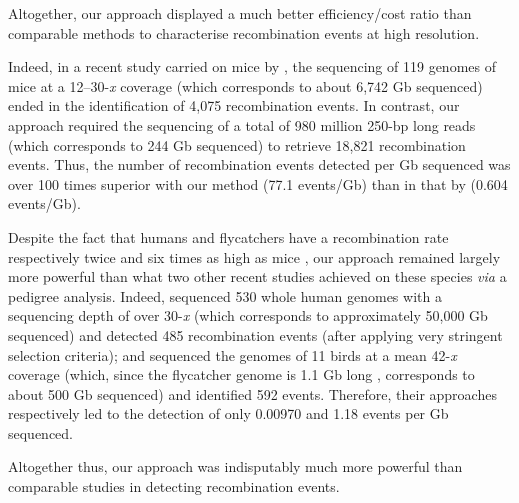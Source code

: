 \begin{mccorrection}
Altogether, our approach displayed a much better efficiency/cost ratio than comparable methods to characterise recombination events at high resolution.

Indeed, in a recent study carried on mice by \citet{li2018highresolution}, the sequencing of 119 genomes of mice at a 12--30-\textit{x} coverage (which corresponds to about 6,742 Gb sequenced) ended in the identification of 4,075 recombination events.
In contrast, our approach required the sequencing of a total of 980 million 250-bp long reads (which corresponds to 244 Gb sequenced) to retrieve 18,821 recombination events.
Thus, the number of recombination events detected per Gb sequenced was over 100 times superior with our method (77.1 events/Gb) than in that by \citet{li2018highresolution} (0.604 events/Gb).

Despite the fact that humans and flycatchers have a recombination rate respectively twice and six times as high as mice \citep{kawakami2014highdensity,kawakami2017wholegenome}, our approach remained largely more powerful than what two other recent studies achieved on these species \textit{via} a pedigree analysis.
Indeed, \citet{halldorsson2016rate} sequenced 530 whole human genomes with a sequencing depth of over 30-\textit{x} (which corresponds to approximately 50,000 Gb sequenced) and detected 485 recombination events (after applying very stringent selection criteria); 
and \citet{smeds2016highresolution} sequenced the genomes of 11 birds at a mean 42-\textit{x} coverage (which, since the flycatcher genome is 1.1 Gb long \citep{ellegren2012genomic}, corresponds to about 500 Gb sequenced) and identified 592 events.
Therefore, their approaches respectively led to the detection of only 0.00970 and 1.18 events per Gb sequenced.

Altogether thus, our approach was indisputably much more powerful than comparable studies in detecting recombination events.

%


\end{mccorrection}
